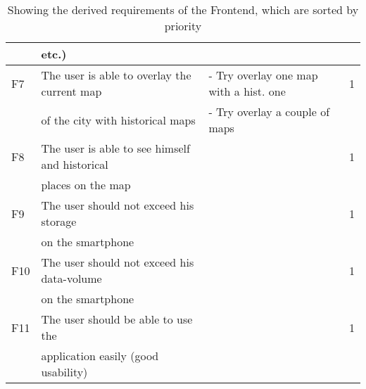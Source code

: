 \begin{table}[h]
\begin{tabular}{llll}
	& etc.)								&	& \\
\hline
F7 & The user is able to overlay the current map  & - Try overlay one map with a hist. one & 1\\
	& of the city with historical maps			& - Try overlay a couple of maps	& \\
\hline
F8 & The user is able to see himself and historical &  	& 1\\
	& places on the map 					&	&  \\
\hline
F9 & The user should not exceed his storage 	&  	& 1\\
	& on the smartphone					&	& \\
\hline
F10 & The user should not exceed his data-volume &  	& 1\\
	& on the smartphone					&	& \\
\hline
F11 & The user should be able to use the  		&  	& 1\\
	& application easily (good usability)			&	& \\
	\bottomrule
\end{tabular}
\caption{Showing the derived requirements of the Frontend, which are sorted by priority}
\label{RequirementsFrontend}
\end{table}

